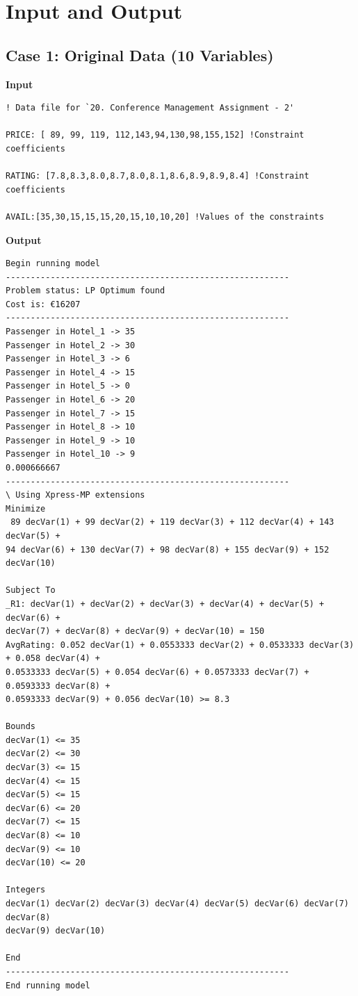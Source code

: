 \documentclass[paper=a4, fontsize=11pt]{scrartcl} %
\begin{document}
\section{Input and Output}
\subsection{Case 1: Original Data (10 Variables)}
\textbf{Input}
\begin{verbatim}
! Data file for `20. Conference Management Assignment - 2'

PRICE: [ 89, 99, 119, 112,143,94,130,98,155,152] !Constraint coefficients	 	

RATING: [7.8,8.3,8.0,8.7,8.0,8.1,8.6,8.9,8.9,8.4] !Constraint coefficients

AVAIL:[35,30,15,15,15,20,15,10,10,20] !Values of the constraints
\end{verbatim}
\textbf{Output}
\begin{verbatim}
Begin running model
---------------------------------------------------------
Problem status: LP Optimum found
Cost is: €16207
---------------------------------------------------------
Passenger in Hotel_1 -> 35
Passenger in Hotel_2 -> 30
Passenger in Hotel_3 -> 6
Passenger in Hotel_4 -> 15
Passenger in Hotel_5 -> 0
Passenger in Hotel_6 -> 20
Passenger in Hotel_7 -> 15
Passenger in Hotel_8 -> 10
Passenger in Hotel_9 -> 10
Passenger in Hotel_10 -> 9
0.000666667
---------------------------------------------------------
\ Using Xpress-MP extensions
Minimize
 89 decVar(1) + 99 decVar(2) + 119 decVar(3) + 112 decVar(4) + 143 decVar(5) + 
94 decVar(6) + 130 decVar(7) + 98 decVar(8) + 155 decVar(9) + 152 decVar(10)

Subject To
_R1: decVar(1) + decVar(2) + decVar(3) + decVar(4) + decVar(5) + decVar(6) + 
decVar(7) + decVar(8) + decVar(9) + decVar(10) = 150
AvgRating: 0.052 decVar(1) + 0.0553333 decVar(2) + 0.0533333 decVar(3) + 0.058 decVar(4) + 
0.0533333 decVar(5) + 0.054 decVar(6) + 0.0573333 decVar(7) + 0.0593333 decVar(8) + 
0.0593333 decVar(9) + 0.056 decVar(10) >= 8.3

Bounds
decVar(1) <= 35
decVar(2) <= 30
decVar(3) <= 15
decVar(4) <= 15
decVar(5) <= 15
decVar(6) <= 20
decVar(7) <= 15
decVar(8) <= 10
decVar(9) <= 10
decVar(10) <= 20

Integers
decVar(1) decVar(2) decVar(3) decVar(4) decVar(5) decVar(6) decVar(7) decVar(8) 
decVar(9) decVar(10) 

End
---------------------------------------------------------
End running model
\end{verbatim}
\end{document}
